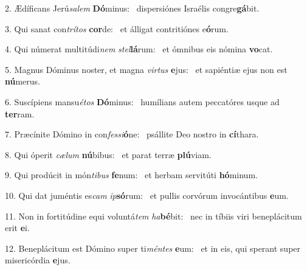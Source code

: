 2. Ædíficans Jerú\textit{sa}\textit{lem} \textbf{Dó}minus: \ast\  dispersiónes Israélis congre\textbf{gá}bit.\

3. Qui sanat con\textit{trí}\textit{tos} \textbf{cor}de: \ast\  et álligat contritiónes e\textbf{ó}rum.\

4. Qui númerat multitúdi\textit{nem} \textit{stel}\textbf{lá}rum: \ast\  et ómnibus eis nómina \textbf{vo}cat.\

5. Magnus Dóminus noster, et magna \textit{vir}\textit{tus} \textbf{e}jus: \ast\  et sapiéntiæ ejus non est \textbf{nú}merus.\

6. Suscípiens mansu\textit{é}\textit{tos} \textbf{Dó}minus: \ast\  humílians autem peccatóres usque ad \textbf{ter}ram.\

7. Præcínite Dómino in con\textit{fes}\textit{si}\textbf{ó}ne: \ast\  psállite Deo nostro in \textbf{cí}thara.\

8. Qui óperit \textit{cæ}\textit{lum} \textbf{nú}bibus: \ast\  et parat terræ \textbf{plú}viam.\

9. Qui prodúcit in món\textit{ti}\textit{bus} \textbf{fe}num: \ast\  et herbam servitúti \textbf{hó}minum.\

10. Qui dat juméntis es\textit{cam} \textit{ip}\textbf{só}rum: \ast\  et pullis corvórum invocántibus \textbf{e}um.\

11. Non in fortitúdine equi voluntá\textit{tem} \textit{ha}\textbf{bé}bit: \ast\  nec in tíbiis viri beneplácitum erit \textbf{e}i.\

12. Beneplácitum est Dómino super ti\textit{mén}\textit{tes} \textbf{e}um: \ast\  et in eis, qui sperant super misericórdia \textbf{e}jus.\

